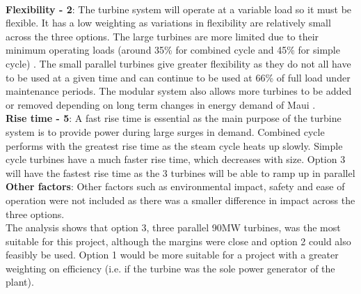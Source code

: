 \documentclass[11pt, oneside]{article}
\begin{document}
\\\textbf{Flexibility - 2}: The turbine system will operate at a variable load so it must be flexible. It has a low weighting as variations in flexibility are relatively small across the three options. The large turbines are more limited due to their minimum operating loads (around 35\% for combined cycle and 45\% for simple cycle) \cite{boyce}. The small parallel turbines give greater flexibility as they do not all have to be used at a given time and can continue to be used at 66\% of full load under maintenance periods. The modular system also allows more turbines to be added or removed depending on long term changes in energy demand of Maui \cite{website:multipleunits}. %
\\\textbf{Rise time - 5}: A fast rise time is essential as the main purpose of the turbine system is to provide power during large surges in demand. Combined cycle performs with the greatest rise time as the steam cycle heats up slowly. Simple cycle turbines have a much faster rise time, which decreases with size. Option 3 will have the fastest rise time as the 3 turbines will be able to ramp up in parallel %
\\\textbf{Other factors}: Other factors such as environmental impact, safety and ease of operation were not included as there was a smaller difference in impact across the three options.\\
The analysis shows that option 3, three parallel 90MW turbines, was the most suitable for this project, although the margins were close and option 2 could also feasibly be used. Option 1 would be more suitable for a project with a greater weighting on efficiency (i.e. if the turbine was the sole power generator of the plant).
\end{document}
